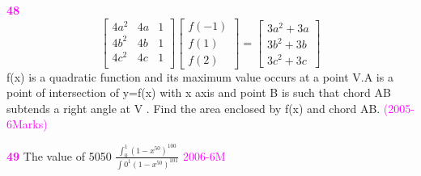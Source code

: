 \documentclass[journal,12pt,twocolumn]{IEEEtran}
\theoremstyle{remark}
\begin{document}
																						        \textbf{\textcolor{magenta}{48}}
																							   \[
																							      \begin{bmatrix}
																							         4a^2 & 4a & 1\\
																								    4b^2 & 4b & 1\\
																								       4c^2 & 4c & 1\\
																								          \end{bmatrix}
																									     \begin{bmatrix}
																									            f(-1)\\
																										           f(1)\\
																											          f(2)
																												     \end{bmatrix}
																												        =
																													   \begin{bmatrix}
																													      3a^2+3a\\
																													         3b^2+3b\\
																														    3c^2+3c
																														       \end{bmatrix}
																														           \]
																															      f(x) is a quadratic function and its maximum value occurs at a point V.A is a point of intersection of y=f(x) with x axis and point B is such that chord AB subtends a right angle at V . Find the area enclosed by f(x) and chord AB.
																															        \hfill{\textcolor{magenta}{(2005-6Marks)}}

																																  \textbf{\textcolor{magenta}{49}}
																																    The value of 5050 $\frac{\int_{0}^{1}(1-x^50)^100}{\int{0}^{1} {(1-x^50)^101}}$
																																      \hfill{\textcolor{magenta}{2006-6M}}

																																         
																																	    
																																	      





																																	        
\end{document}

